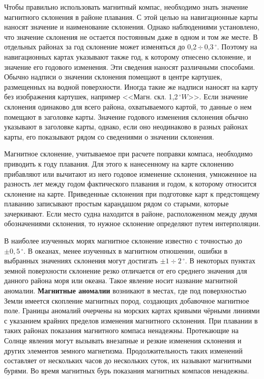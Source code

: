 \documentclass[a4paper, 12pt, twoside, final, book, russian, fittopage, cyremdash]{ncc}
\newcommand{\gr}{\ensuremath{\,^\circ}\xspace}
\newcommand{\otdo}{\,\ensuremath{\div}\,}
\newcommand{\motdo}{\div}
\begin{document}
Чтобы правильно использовать магнитный компас, необходимо знать значение магнитного склонения в районе плавания. С этой целью на навигационные карты наносят значение и наименование склонения. Однако наблюдениями установлено, что значение склонения не остается постоянным даже в одном и том же месте. В отдельных районах за год склонение может изменяться до 0,2\otdo 0,3\gr. Поэтому на навигационных картах указывают также год, к которому отнесено склонение, и значение его годового изменения. Эти сведения наносят различными способами. Обычно надписи о значении склонения помещают в центре картушек, размещенных на водной поверхности. Иногда такие же надписи наносят на карту без изображения картушек, например <<Магн. скл. 1,2\gr $W$>>. Если значение склонения одинаково для всего района, охватываемого картой, то данные о нем помещают в заголовке карты. Значение годового изменения склонения обычно указывают в заголовке карты, однако, если оно неодинаково в разных районах карты, его показывают рядом со сведениями о значении склонения.  

Магнитное склонение, учитываемое при расчете поправки компаса, необходимо приводить к году плавания. Для этого к нанесенному на карте склонению прибавляют или вычитают из него годовое изменение склонения, умноженное на разность лет между годом фактического плавания и годом, к которому относится склонение на карте. Приведенные склонения при подготовке карт к предстоящему плаванию записывают простым карандашом рядом со старыми, которые зачеркивают. Если место судна находится в районе, расположенном между двумя обозначениями склонения, то нужное склонение определяют путем интерполяции. 

В наиболее изученных морях магнитное склонение известно с точностью до $\pm 0,5\gr$. В океанах, менее изученных в магнитном отношении, ошибки в выбранных значениях склонения могут достигать $\pm 1\motdo 2\gr$. В некоторых пунктах земной поверхности склонение резко отличается от его среднего значения для данного района моря или океана. Такое явление носит название магнитной аномалии. \textbf{Магнитные аномалии} возникают в местах, где под поверхностью Земли имеется скопление магнитных пород, создающих добавочное магнитное поле. Границы аномалий очерчены на морских картах кривыми чёрными линиями с указанием крайних пределов изменения магнитного склонения. При плавании в таких районах показания магнитного компаса ненадежны. Протекающие на Солнце явления могут вызывать внезапные и резкие изменения склонения и других элементов земного магнетизма. Продолжительность таких изменений составляет от нескольких часов до нескольких суток, их называют магнитными бурями. Во время магнитных бурь показания магнитных компасов ненадежны. 
\end{document}
